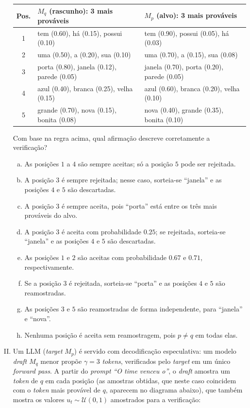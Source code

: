 \documentclass{dlproblemset}
\begin{document}
\begin{enumerate}[I)]
\begin{center}
\small
\begin{tabular}{c|l|l}
\textbf{Pos.} & \textbf{$M_q$ (rascunho): 3 mais prováveis} & \textbf{$M_p$ (alvo): 3 mais prováveis} \\ \hline
1 & tem (0.60), há (0.15), possui (0.10)       & tem (0.90), possui (0.05), há (0.03) \\
2 & uma (0.50), a (0.20), sua (0.10)           & uma (0.70), a (0.15), sua (0.08) \\
3 & porta (0.80), janela (0.12), parede (0.05) & janela (0.70), porta (0.20), parede (0.05) \\
4 & azul (0.40), branca (0.25), velha (0.15)   & azul (0.60), branca (0.20), velha (0.10) \\
5 & grande (0.70), nova (0.15), bonita (0.08)  & nova (0.40), grande (0.35), bonita (0.10) \\
\end{tabular}
\end{center}

Com base na regra acima, qual afirmação descreve corretamente a verificação?

\begin{enumerate}[a)]
    \item As posições $1$ a $4$ são sempre aceitas; só a posição $5$ pode ser rejeitada.
    \item A posição $3$ é sempre rejeitada; nesse caso, sorteia-se ``janela'' e as posições $4$ e $5$ são descartadas.
    \item A posição $3$ é sempre aceita, pois ``porta'' está entre os três mais prováveis do alvo.
    \item A posição $3$ é aceita com probabilidade $0.25$; se rejeitada, sorteia-se ``janela'' e as posições $4$ e $5$ são descartadas.
    \item As posições $1$ e $2$ são aceitas com probabilidade $0.67$ e $0.71$, respectivamente.
    \item Se a posição $3$ é rejeitada, sorteia-se ``porta'' e as posições $4$ e $5$ são reamostradas.
    \item As posições $3$ e $5$ são reamostradas de forma independente, para ``janela'' e ``nova''.
    \item Nenhuma posição é aceita sem reamostragem, pois $p \neq q$ em todas elas.
\end{enumerate}

\item Um LLM (\textit{target} $M_p$) é servido com decodificação especulativa: um modelo \textit{draft} $M_q$ menor propõe $\gamma = 3$ \textit{tokens}, verificados pelo \textit{target} em um único \textit{forward pass}. A partir do \textit{prompt} \textit{``O time venceu o''}, o \textit{draft} amostra um \textit{token} de $q$ em cada posição (as amostras obtidas, que neste caso coincidem com o \textit{token} mais provável de $q$, aparecem no diagrama abaixo), que também mostra os valores $u_t \sim \mathcal{U}(0,1)$ amostrados para a verificação:


\end{enumerate}
\end{document}
